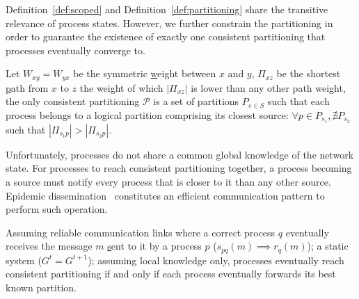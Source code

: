 Definition~\ref{def:scoped} and Definition~\ref{def:partitioning}
share the transitive relevance of process states. However, we further
constrain the partitioning in order to guarantee the existence of
exactly one consistent partitioning that processes eventually converge
to.

\begin{definition}
  Let $W_{xy} = W_{yx}$ be the symmetric \underline{w}eight between
  $x$ and $y$, $\Pi_{xz}$ be the shortest \underline{p}ath from $x$ to
  $z$ the weight of which $|\Pi_{xz}|$ is lower than any other path
  weight, the only consistent partitioning $\mathcal{P}$ is a set of
  partitions $P_{s\in S}$ such that each process belongs to a logical
  partition comprising its closest source: $\forall p \in P_{s_1},
  \nexists P_{s_2}$ such that $|\Pi_{s_1p}| > |\Pi_{s_2p}|$.
\end{definition}

Unfortunately, processes do not share a common global knowledge of the
network state. For processes to reach consistent partitioning
together, a process becoming a source must notify every process that
is closer to it than any other source. Epidemic
dissemination~\cite{birman1999bimodal} constitutes an efficient
communication pattern to perform such operation. 

\begin{theorem}
  Assuming reliable communication links where a correct process $q$
  eventually receives the message $m$ \underline{s}ent to it by a
  process $p$ ($s_{pq}(m) \implies r_{q}(m)$); a static system ($G^t =
  G^{t+1}$); assuming local knowledge only, processes eventually reach
  consistent partitioning if and only if each process eventually
  forwards its best known partition.
\end{theorem}


